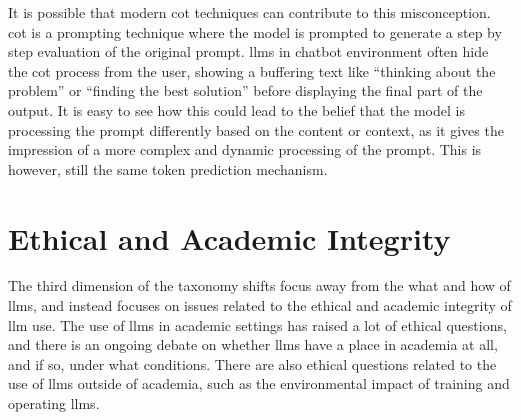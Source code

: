 It is possible that modern \gls{cot} techniques can contribute to this misconception. \gls{cot} is a prompting technique where the model is prompted to generate a step by step evaluation of the original prompt. \gls{llms} in chatbot environment often hide the \gls{cot} process from the user, showing a buffering text like ``thinking about the problem'' or ``finding the best solution'' before displaying the final part of the output. It is easy to see how this could lead to the belief that the model is processing the prompt differently based on the content or context, as it gives the impression of a more complex and dynamic processing of the prompt.
This is however, still the same token prediction mechanism.

\section{Ethical and Academic Integrity}
The third dimension of the taxonomy shifts focus away from the what and how of \gls{llms}, and instead focuses on issues related to the ethical and academic integrity of \gls{llm} use. The use of \gls{llms} in academic settings has raised a lot of ethical questions, and there is an ongoing debate on whether \gls{llms} have a place in academia at all, and if so, under what conditions. There are also ethical questions related to the use of \gls{llms} outside of academia, such as the environmental impact of training and operating \gls{llms}.


